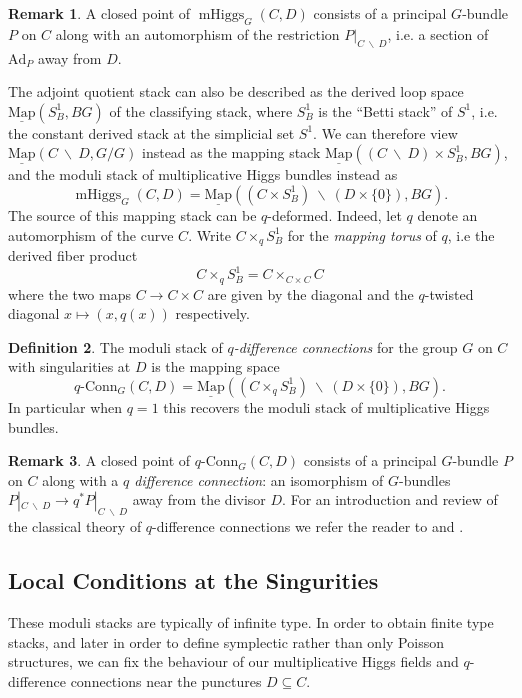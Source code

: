 \documentclass[11pt, oneside, reqno]{amsart}
\theoremstyle{definition} \newtheorem{definition}{Definition}[section]
\theoremstyle{definition} \newtheorem{remark}[definition]{Remark}
\theoremstyle{definition} \newtheorem{remarks}[definition]{Remarks}
\theoremstyle{definition} \newtheorem{question}[definition]{Question}
\theoremstyle{definition} \newtheorem*{note}{Note}
\theoremstyle{definition} \newtheorem{example}[definition]{Example}
\theoremstyle{definition} \newtheorem{examples}[definition]{Examples}
\newcommand{\mr}[1]{\mathrm{#1}}
\newcommand{\bs}{\ \backslash \ }
\newcommand{\ul}[1]{\underline{#1}}
\newcommand{\sub}{\subseteq}
\DeclareMathOperator{\mhiggs}{mHiggs}
\newcommand{\map}{\ul{\mr{Map}}}
\newcommand{\qconn}{q\text{-Conn}}
\newcommand{\Ad}{\mr{Ad}}
\begin{document}
\begin{remark}
A closed point of $\mhiggs_G(C,D)$ consists of a principal $G$-bundle $P$ on $C$ along with an automorphism of the restriction $P|_{C \! \bs \! D}$, i.e. a section of $\Ad_P$ away from $D$.
\end{remark}

The adjoint quotient stack can also be described as the derived loop space $\map(S^1_B, BG)$ of the classifying stack, where $S^1_B$ is the ``Betti stack'' of $S^1$, i.e. the constant derived stack at the simplicial set $S^1$.  We can therefore view $\map(C \! \bs \! D, G/G)$ instead as the mapping stack $\map((C \! \bs \! D) \times S^1_B, BG)$, and the moduli stack of multiplicative Higgs bundles instead as
\[\mhiggs_G(C,D) = \map((C \times S^1_B) \bs (D \times \{0\}), BG).\]  
The source of this mapping stack can be $q$-deformed.  Indeed, let $q$ denote an automorphism of the curve $C$.  Write $C \times_q S^1_B$ for the \emph{mapping torus} of $q$, i.e the derived fiber product
\[C \times_q S^1_B = C \times_{C \times C} C\]
where the two maps $C \to C \times C$ are given by the diagonal and the $q$-twisted diagonal $x \mapsto (x,q(x))$ respectively.

\begin{definition}
The moduli stack of \emph{$q$-difference connections} for the group $G$ on $C$ with singularities at $D$ is the mapping space
\[\qconn_G(C,D) = \map((C \times_q S^1_B) \bs (D \times \{0\}), BG).\] 
In particular when $q=1$ this recovers the moduli stack of multiplicative Higgs bundles.
\end{definition}

\begin{remark}
  A closed point of $\qconn_G(C,D)$ consists of a principal $G$-bundle
  $P$ on $C$ along with a \emph{$q$ difference connection}: an
  isomorphism of $G$-bundles
  $P|_{C \! \bs \! D} \to q^*P|_{C \! \bs \! D}$ away from the divisor
  $D$.  For an introduction and review of the classical theory of $q$-difference
  connections we refer the reader to \cite{STSSevostyanov} and \cite{Sauloy}.
\end{remark}

\subsection{Local Conditions at the Singurities}
These moduli stacks are typically of infinite type.  In order to obtain finite type stacks, and later in order to define symplectic rather than only Poisson structures, we can fix the behaviour of our multiplicative Higgs fields and $q$-difference connections near the punctures $D \sub C$.
\end{document}
